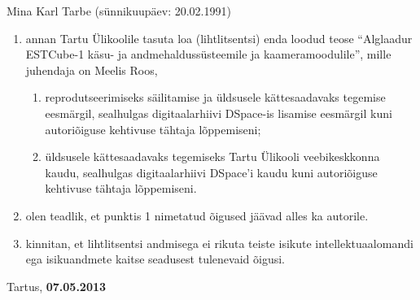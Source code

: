 \documentclass[12pt,a4paper]{article}
\begin{document}
Mina Karl Tarbe (sünnikuupäev: 20.02.1991)
\begin{enumerate}
	\item
		annan Tartu Ülikoolile tasuta loa (lihtlitsentsi) enda loodud teose ``Alglaadur
		ESTCube-1 käsu- ja andmehaldussüsteemile ja kaameramoodulile'', mille juhendaja on
		Meelis Roos,
		\begin{enumerate}
			\item 
				reprodutseerimiseks säilitamise ja üldsusele kättesaadavaks
				tegemise eesmärgil, sealhulgas digitaalarhiivi DSpace-is
				lisamise eesmärgil kuni autoriõiguse kehtivuse tähtaja
				lõppemiseni;
			\item
				üldsusele kättesaadavaks tegemiseks Tartu Ülikooli
				veebikeskkonna kaudu, sealhulgas digitaalarhiivi DSpace'i kaudu
				kuni autoriõiguse kehtivuse tähtaja lõppemiseni.
		\end{enumerate}
	\item
		olen teadlik, et punktis 1 nimetatud õigused jäävad alles ka autorile.
	\item
		kinnitan, et lihtlitsentsi andmisega ei rikuta teiste isikute
		intellektuaalomandi ega isikuandmete kaitse seadusest tulenevaid õigusi.
\end{enumerate}

Tartus, \textbf{07.05.2013}
\end{document}
